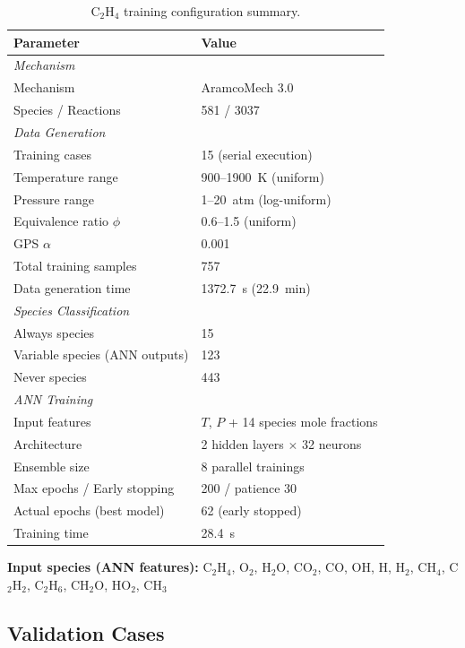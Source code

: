 \documentclass[11pt,a4paper]{article}
\begin{document}
\begin{table}[H]
\centering
\caption{C$_2$H$_4$ training configuration summary.}
\label{tab:c2h4_config}
\begin{tabular}{ll}
\toprule
\textbf{Parameter} & \textbf{Value} \\
\midrule
\multicolumn{2}{l}{\textit{Mechanism}} \\
\quad Mechanism & AramcoMech 3.0 \\
\quad Species / Reactions & 581 / 3037 \\
\midrule
\multicolumn{2}{l}{\textit{Data Generation}} \\
\quad Training cases & 15 (serial execution) \\
\quad Temperature range & 900--1900~K (uniform) \\
\quad Pressure range & 1--20~atm (log-uniform) \\
\quad Equivalence ratio $\phi$ & 0.6--1.5 (uniform) \\
\quad GPS $\alpha$ & 0.001 \\
\quad Total training samples & 757 \\
\quad Data generation time & 1372.7~s (22.9~min) \\
\midrule
\multicolumn{2}{l}{\textit{Species Classification}} \\
\quad Always species & 15 \\
\quad Variable species (ANN outputs) & 123 \\
\quad Never species & 443 \\
\midrule
\multicolumn{2}{l}{\textit{ANN Training}} \\
\quad Input features & $T$, $P$ + 14 species mole fractions \\
\quad Architecture & 2 hidden layers $\times$ 32 neurons \\
\quad Ensemble size & 8 parallel trainings \\
\quad Max epochs / Early stopping & 200 / patience 30 \\
\quad Actual epochs (best model) & 62 (early stopped) \\
\quad Training time & 28.4~s \\
\bottomrule
\end{tabular}
\end{table}

\textbf{Input species (ANN features):} C$_2$H$_4$, O$_2$, H$_2$O, CO$_2$, CO, OH, H, H$_2$, CH$_4$, C$_2$H$_2$, C$_2$H$_6$, CH$_2$O, HO$_2$, CH$_3$

\subsection{Validation Cases}
\end{document}
